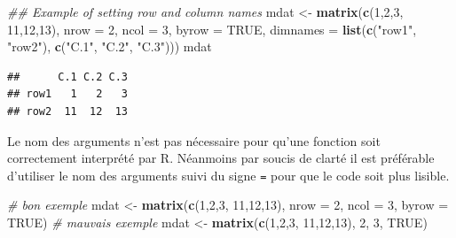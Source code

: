 \documentclass[]{book}
\newenvironment{Shaded}{\begin{snugshade}}{\end{snugshade}}
\newcommand{\CommentTok}[1]{\textcolor[rgb]{0.56,0.35,0.01}{\textit{#1}}}
\newcommand{\DataTypeTok}[1]{\textcolor[rgb]{0.13,0.29,0.53}{#1}}
\newcommand{\DecValTok}[1]{\textcolor[rgb]{0.00,0.00,0.81}{#1}}
\newcommand{\KeywordTok}[1]{\textcolor[rgb]{0.13,0.29,0.53}{\textbf{#1}}}
\newcommand{\NormalTok}[1]{#1}
\newcommand{\OtherTok}[1]{\textcolor[rgb]{0.56,0.35,0.01}{#1}}
\newcommand{\StringTok}[1]{\textcolor[rgb]{0.31,0.60,0.02}{#1}}
\begin{document}
\begin{Shaded}
\begin{Highlighting}[]
\CommentTok{## Example of setting row and column names}
\NormalTok{mdat <-}\StringTok{ }\KeywordTok{matrix}\NormalTok{(}\KeywordTok{c}\NormalTok{(}\DecValTok{1}\NormalTok{,}\DecValTok{2}\NormalTok{,}\DecValTok{3}\NormalTok{, }\DecValTok{11}\NormalTok{,}\DecValTok{12}\NormalTok{,}\DecValTok{13}\NormalTok{), }\DataTypeTok{nrow =} \DecValTok{2}\NormalTok{, }\DataTypeTok{ncol =} \DecValTok{3}\NormalTok{, }\DataTypeTok{byrow =} \OtherTok{TRUE}\NormalTok{,}
               \DataTypeTok{dimnames =} \KeywordTok{list}\NormalTok{(}\KeywordTok{c}\NormalTok{(}\StringTok{"row1"}\NormalTok{, }\StringTok{"row2"}\NormalTok{),}
                               \KeywordTok{c}\NormalTok{(}\StringTok{"C.1"}\NormalTok{, }\StringTok{"C.2"}\NormalTok{, }\StringTok{"C.3"}\NormalTok{)))}
\NormalTok{mdat}
\end{Highlighting}
\end{Shaded}

\begin{verbatim}
##      C.1 C.2 C.3
## row1   1   2   3
## row2  11  12  13
\end{verbatim}

Le nom des arguments n'est pas nécessaire pour qu'une fonction soit correctement interprété par R. Néanmoins par soucis de clarté il est préférable d'utiliser le nom des arguments suivi du signe \texttt{=} pour que le code soit plus lisible.

\begin{Shaded}
\begin{Highlighting}[]
\CommentTok{# bon exemple}
\NormalTok{mdat <-}\StringTok{ }\KeywordTok{matrix}\NormalTok{(}\KeywordTok{c}\NormalTok{(}\DecValTok{1}\NormalTok{,}\DecValTok{2}\NormalTok{,}\DecValTok{3}\NormalTok{, }\DecValTok{11}\NormalTok{,}\DecValTok{12}\NormalTok{,}\DecValTok{13}\NormalTok{), }\DataTypeTok{nrow =} \DecValTok{2}\NormalTok{, }\DataTypeTok{ncol =} \DecValTok{3}\NormalTok{, }\DataTypeTok{byrow =} \OtherTok{TRUE}\NormalTok{)}
\CommentTok{# mauvais exemple}
\NormalTok{mdat <-}\StringTok{ }\KeywordTok{matrix}\NormalTok{(}\KeywordTok{c}\NormalTok{(}\DecValTok{1}\NormalTok{,}\DecValTok{2}\NormalTok{,}\DecValTok{3}\NormalTok{, }\DecValTok{11}\NormalTok{,}\DecValTok{12}\NormalTok{,}\DecValTok{13}\NormalTok{), }\DecValTok{2}\NormalTok{, }\DecValTok{3}\NormalTok{, }\OtherTok{TRUE}\NormalTok{)}
\end{Highlighting}
\end{Shaded}
\end{document}

